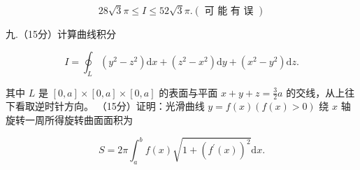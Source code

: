 \documentclass{examcollection}
\renewcommand{\displayformula}[1]{\[#1\]}
\begin{document}
{\begin{minipage}{\textwidth}
\displayformula{28 \sqrt {3} \pi \leq I \leq 52 \sqrt {3} \pi . (\text { 可   能   有   误 })}\par
九.（15分）计算曲线积分\par
\displayformula{I = \oint_ {L} (y ^ {2} - z ^ {2}) \mathrm{d} x + (z ^ {2} - x ^ {2}) \mathrm{d} y + (x ^ {2} - y ^ {2}) \mathrm{d} z.}\par
其中 $L$ 是 $[0, a] \times [0, a] \times [0, a]$ 的表面与平面 $x + y + z = \frac{3}{2} a$ 的交线，从上往下看取逆时针方向。
（15分）证明：光滑曲线 $y = f(x) (f(x) > 0)$ 绕 $x$ 轴旋转一周所得旋转曲面面积为\par
\displayformula{S = 2 \pi \int_ {a} ^ {b} f (x) \sqrt {1 + (f ^ {\prime} (x)) ^ {2}} \mathrm{d} x.}\par
\end{minipage}}
\ifdim\dimexpr\ht\proofbox+\dp\proofbox\relax>\textheight
\noindent\resizebox{!}{\textheight}{\usebox{\proofbox}}\else\noindent\usebox{\proofbox}\fi\clearpage
\end{document}

